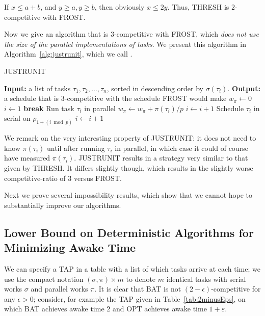 If $x \le a + b$, and $y \ge a, y \ge b$, then obviously $x \le
2y$. Thus, THRESH is $2$-competitive with FROST. 

Now we give an algorithm that is $3$-competitive with FROST,
which \emph{does not use the size of the parallel implementations
of tasks}. We present this algorithm in
Algorithm~\ref{alg:justrunit}, which we call .

\begin{algorithm}
  \caption{JUSTRUNIT}
  \label{alg:justrunit}
  \begin{algorithmic}
    \State \textbf{Input: } a list of tasks $\tau_1, \tau_2,
    \ldots, \tau_n$, sorted in descending order by
    $\sigma(\tau_i).$
    \State \textbf{Output: } a schedule that is $3$-competitive
    with the schedule FROST would make
    \State 
    \State $w_\pi \gets 0$
    \State $i \gets 1$
        \State \textbf{break}
      \EndIf
      \State Run task $\tau_i$ in parallel
      \State $w_\pi \gets w_\pi + \pi(\tau_i)/p$
      \State $i \gets i+1$
    \EndWhile
      \State Schedule $\tau_i$ in serial on $\rho_{1+(i \bmod p)}$
      \State $i \gets i+1$
    \EndWhile
  \end{algorithmic}
\end{algorithm}

We remark on the very interesting property of JUSTRUNIT: it does
not need to know $\pi(\tau_i)$ until after running $\tau_i$ in
parallel, in which case it could of course have measured
$\pi(\tau_i)$. JUSTRUNIT results in a strategy very similar to
that given by THRESH. It differs slightly though, which results
in the slightly worse competitive-ratio of $3$ versus FROST. 

Next we prove several impossibility results, which show that we
cannot hope to substantially improve our algorithms.

\subsection{Lower Bound on Deterministic Algorithms for Minimizing Awake Time}
We can specify a TAP in a table with a list of which tasks arrive
at each time; we use the compact notation $(\sigma, \pi)\times m$
to denote $m$ identical tasks with serial works $\sigma$ and
parallel works $\pi$. It is clear that BAT is not
$(2-\epsilon)$-competitive for any $\epsilon > 0$; consider, for
example the TAP given in Table~\ref{tab:2minusEps}, on which BAT
achieves awake time $2$ and OPT achieves awake time
$1+\varepsilon$.

